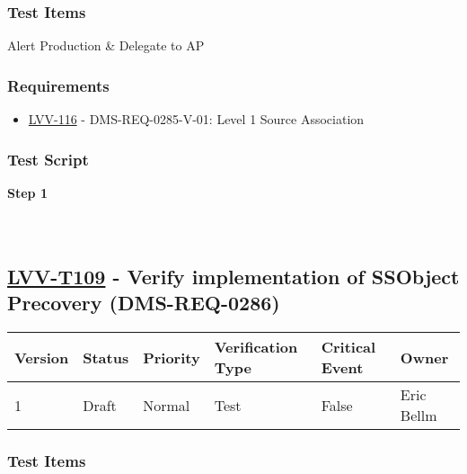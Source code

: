 \hypertarget{test-items-84}{%
\subsubsection{Test Items}\label{test-items-84}}

Alert Production \& Delegate to AP

\hypertarget{requirements-85}{%
\subsubsection{Requirements}\label{requirements-85}}

\begin{itemize}
\tightlist
\item
  \href{https://jira.lsstcorp.org/browse/LVV-116}{LVV-116} -
  DMS-REQ-0285-V-01: Level 1 Source Association
\end{itemize}

\hypertarget{test-script-85}{%
\subsubsection{Test Script}\label{test-script-85}}

\textbf{Step 1}\\
~\\
~\\

\hypertarget{lvv-t109---verify-implementation-of-ssobject-precovery-dms-req-0286}{%
\subsection{\texorpdfstring{\href{https://jira.lsstcorp.org/secure/Tests.jspa\#/testCase/LVV-T109}{LVV-T109}
- Verify implementation of SSObject Precovery
(DMS-REQ-0286)}{LVV-T109 - Verify implementation of SSObject Precovery (DMS-REQ-0286)}}\label{lvv-t109---verify-implementation-of-ssobject-precovery-dms-req-0286}}

\begin{longtable}[]{@{}llllll@{}}
\toprule
Version & Status & Priority & Verification Type & Critical Event &
Owner\tabularnewline
\midrule
\endhead
1 & Draft & Normal & Test & False & Eric Bellm\tabularnewline
\bottomrule
\end{longtable}

\hypertarget{test-items-85}{%
\subsubsection{Test Items}\label{test-items-85}}


